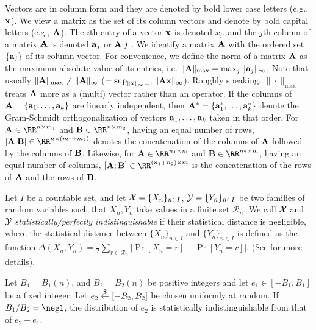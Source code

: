 \documentclass{fundam}
\begin{document}
Vectors are in column form and they are denoted by bold lower case letters (e.g., $\mathbf{x}$). We view a matrix as the set of its column vectors and denote by bold capital letters (e.g., $\mathbf{A}$). The $i$th entry of a vector $\mathbf{x}$ is denoted $x_{i}$, and the $j$th column of a matrix $\mathbf{A}$ is denoted $\mathbf{a}_{j}$ or $\mathbf{A}[j]$. We identify a matrix $\mathbf{A}$ with the ordered set $\{\mathbf{a}_{j}\}$ of its column vector. For convenience, we define the norm of a matrix $\mathbf{A}$ as the maximum absolute value of its entries, i.e. $\|\mathbf{A}\|_{\max} = \max_{j}\|\mathbf{a}_{j}\|_{\infty}$. Note that usually $\|\mathbf{A}\|_{\max} \neq \|\mathbf{A} \|_{\infty} $ ($=\sup_{\|\mathbf{x}\|_{\infty}=1}\|\mathbf{A}\mathbf{x}\|_{\infty}$). Roughly speaking, $\|\cdot \|_{\max}$ treats $\mathbf{A}$ more as a (multi) vector rather than an operator. If the columns of $\mathbf{A} = \{ \mathbf{a}_{1}, \ldots ,  \mathbf{a}_{k} \}$ are linearly independent, then $\mathbf{A}^{*} = \{ \mathbf{a}_{1}^{*}, \ldots ,  \mathbf{a}_{k}^{*} \} $ denote the Gram-Schmidt orthogonalization of vectors $\mathbf{a}_{1}, \ldots ,  \mathbf{a}_{k}$ taken in that order. For $\vr{A}\in\RR^{n\times m_{1}}$ and $\vr{B}\in\RR^{n\times m_{2}}$, having an equal number of rows, $[\vr{A}|\vr{B}]\in\RR^{n\times (m_{1}+m_{2})}$ denotes the concatenation of the columns of $\mathbf{A}$ followed by the columns of $\mathbf{B}$. Likewise, for  $\vr{A}\in\RR^{n_{1}\times m}$ and $\vr{B}\in\RR^{n_{2}\times m}$, having an equal number of columns, $[\vr{A};\vr{B}]\in\RR^{(n_{1}+n_{2})\times m}$ is the concatenation of the rows of $\mathbf{A}$ and the rows of $\mathbf{B}$.

Let $I$ be a countable set, and let $\mathcal{X}=\{X_{n}\}_{n\in I}$, $\mathcal{Y}=\{Y_{n}\}_{n\in I}$ be two families of random variables such that $X_{n}, Y_{n}$ take values in a finite set $\mathcal{R}_{n}$. We call $\mathcal{X}$ and $\mathcal{Y}$ \textit{statistically/perfectly indistinguishable} if  their statistical distance is negligible, where the statistical distance between $\{X_{n}\}_{n\in I}$ and $\{Y_{n}\}_{n\in I}$ is defined as the function
	$\Delta(X_{n}, Y_{n}) = \frac{1}{2}\sum_{r\in \mathcal{R}_{n}} \left| \Pr[X_{n}=r] - \Pr[Y_{n}=r]  \right|.$
(See \cite{goldreich2001foundations} for more details).

\begin{lemma}\label{lem::smudging}
	Let $B_{1}=B_{1}(n)$, and $B_{2}=B_{2}(n)$ be positive integers and let $e_{1}\in [-B_{1}, B_{1}]$ be a fixed integer. Let $e_{2}\overset{\$}{\gets} [-B_{2}, B_{2}]$ be chosen uniformly at random. If $B_{1}/B_{2}=\negl$, the distribution of $e_{2}$ is statistically indistinguishable from that of $e_{2}+e_{1}$.
\end{lemma}	
\end{document}
